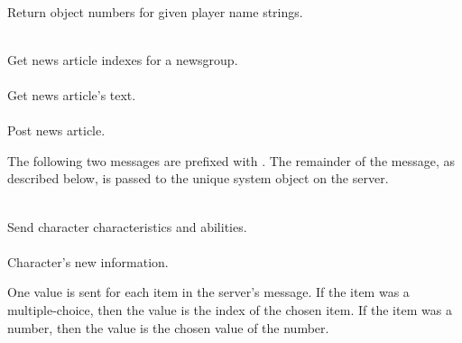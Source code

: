 \begin{protocol}
   \\
Return object numbers for given player name strings. \\

  \\
Get news article indexes for a newsgroup. \\

   \\
Get news article's text. \\

    \\
Post news article. \\
\end{protocol}

The following two messages are prefixed with .  The
remainder of the message, as described below, is passed to the unique
system object on the server.

\begin{protocol}
 \\
Send character characteristics and abilities. \\

     \\
Character's new information.
\end{protocol}
One value is sent for each item in the server's 
message.  If the item was a multiple-choice, then the value is the
index of the chosen item.  If the item was a number, then the value is
the chosen value of the number.

